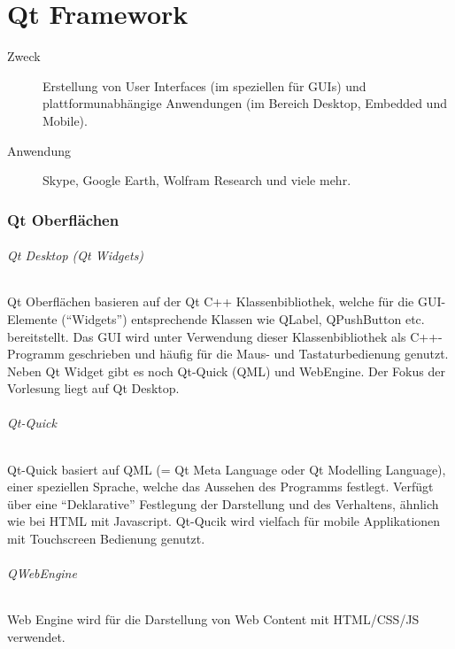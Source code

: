 \part{Qt Framework}

\begin{description}
    \item[Zweck] Erstellung von User Interfaces (im speziellen für GUIs) und plattformunabhängige Anwendungen (im Bereich Desktop, Embedded und Mobile).
    \item[Anwendung] Skype, Google Earth, Wolfram Research und viele mehr.
\end{description}

\section{Qt Oberflächen}
\paragraph{Qt Desktop (Qt Widgets)}
Qt Oberflächen basieren auf der Qt C++ Klassenbibliothek, welche für die GUI-Elemente (``Widgets'') entsprechende Klassen wie QLabel, QPushButton etc. bereitstellt. Das GUI wird unter Verwendung dieser Klassenbibliothek als C++-Programm geschrieben und häufig für die Maus- und Tastaturbedienung genutzt.
Neben Qt Widget gibt es noch Qt-Quick (QML) und WebEngine. Der Fokus der Vorlesung liegt auf Qt Desktop.

\paragraph{Qt-Quick}
Qt-Quick basiert auf QML (= Qt Meta Language oder Qt Modelling Language), einer speziellen Sprache, welche das Aussehen des Programms festlegt. Verfügt über eine ``Deklarative'' Festlegung der Darstellung und des Verhaltens, ähnlich wie bei HTML mit Javascript. Qt-Qucik wird vielfach für mobile Applikationen mit Touchscreen Bedienung genutzt.

\paragraph{QWebEngine}
Web Engine wird für die Darstellung von Web Content mit HTML/CSS/JS verwendet.

